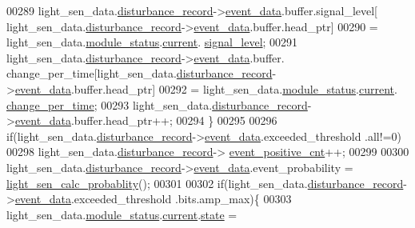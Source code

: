 \begin{DoxyCode}
00289             light\_sen\_data.\hyperlink{a00024_ac9b38e2c1d3f1013a88d33506c754152}{disturbance\_record}->\hyperlink{a00028_a8c0bda69e71ef674e60da47ad0be9ab0}{event\_data}.buffer.signal\_level[
      light\_sen\_data.\hyperlink{a00024_ac9b38e2c1d3f1013a88d33506c754152}{disturbance\_record}->\hyperlink{a00028_a8c0bda69e71ef674e60da47ad0be9ab0}{event\_data}.buffer.head\_ptr]
00290                     = light\_sen\_data.\hyperlink{a00024_a5a53c391562b059eb744ac679f3765ca}{module\_status}.\hyperlink{a00017_ab8af48cdbba92b3ae39c4470e53af944}{current}.
      \hyperlink{a00017_abcdf2bc0c2e5a14863938ae28c3bc96e}{signal\_level};
00291             light\_sen\_data.\hyperlink{a00024_ac9b38e2c1d3f1013a88d33506c754152}{disturbance\_record}->\hyperlink{a00028_a8c0bda69e71ef674e60da47ad0be9ab0}{event\_data}.buffer.
      change\_per\_time[light\_sen\_data.\hyperlink{a00024_ac9b38e2c1d3f1013a88d33506c754152}{disturbance\_record}->\hyperlink{a00028_a8c0bda69e71ef674e60da47ad0be9ab0}{event\_data}.buffer.head\_ptr]
00292                     = light\_sen\_data.\hyperlink{a00024_a5a53c391562b059eb744ac679f3765ca}{module\_status}.\hyperlink{a00017_ab8af48cdbba92b3ae39c4470e53af944}{current}.
      \hyperlink{a00017_ad5c4f9a39d2a36632a53205ae8eb5a5d}{change\_per\_time};
00293             light\_sen\_data.\hyperlink{a00024_ac9b38e2c1d3f1013a88d33506c754152}{disturbance\_record}->\hyperlink{a00028_a8c0bda69e71ef674e60da47ad0be9ab0}{event\_data}.buffer.head\_ptr++;
00294             \}
00295 
00296             \textcolor{keywordflow}{if}(light\_sen\_data.\hyperlink{a00024_ac9b38e2c1d3f1013a88d33506c754152}{disturbance\_record}->\hyperlink{a00028_a8c0bda69e71ef674e60da47ad0be9ab0}{event\_data}.exceeded\_threshold
      .all!=0)
00298                  light\_sen\_data.\hyperlink{a00024_ac9b38e2c1d3f1013a88d33506c754152}{disturbance\_record}->
      \hyperlink{a00028_a7397b9d76d4b57500f27bb23d258a18a}{event\_positive\_cnt}++;
00299 
00300             light\_sen\_data.\hyperlink{a00024_ac9b38e2c1d3f1013a88d33506c754152}{disturbance\_record}->\hyperlink{a00028_a8c0bda69e71ef674e60da47ad0be9ab0}{event\_data}.event\_probability = 
      \hyperlink{a00047_acfaee257a4ad46d9d0ffb57f97d8f35f}{light\_sen\_calc\_probablity}();
00301 
00302             \textcolor{keywordflow}{if}(light\_sen\_data.\hyperlink{a00024_ac9b38e2c1d3f1013a88d33506c754152}{disturbance\_record}->\hyperlink{a00028_a8c0bda69e71ef674e60da47ad0be9ab0}{event\_data}.exceeded\_threshold
      .bits.amp\_max)\{
00303                 light\_sen\_data.\hyperlink{a00024_a5a53c391562b059eb744ac679f3765ca}{module\_status}.\hyperlink{a00017_ab8af48cdbba92b3ae39c4470e53af944}{current}.\hyperlink{a00017_a6b8d8e916bc56265a3fd279bd26b6d1b}{state} = 

\end{DoxyCode}
